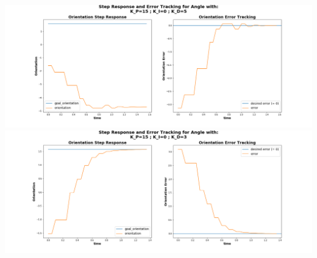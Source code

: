 \documentclass[a4paper,12pt]{article}
\begin{document}
	\includegraphics[scale=0.4]{images/control_ang_15_0_5.png}
	\includegraphics[scale=0.4]{images/control_ang_15_0_3.png}
	
\end{document}
